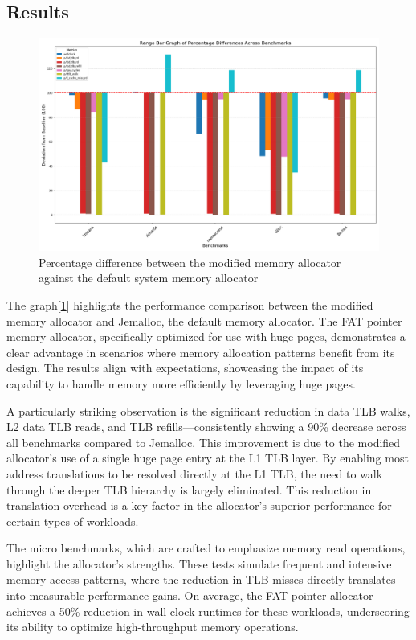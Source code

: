 \documentclass[11pt]{article}
\begin{document}
\subsection{Results}
\label{sec:org921a6b3}
\begin{figure}[htbp]
\centering
\includegraphics[width=.9\linewidth]{./diagrams/bargraph.png}
\caption{\label{fig:orga7f3598}Percentage difference between the modified memory allocator against the default system memory allocator}
\end{figure}


The graph[\ref{fig:orga7f3598}] highlights the performance comparison between the modified memory allocator and 
Jemalloc, the default memory allocator. The FAT pointer memory allocator, specifically optimized 
for use with huge pages, demonstrates a clear advantage in scenarios where memory allocation 
patterns benefit from its design. The results align with expectations, showcasing the impact 
of its capability to handle memory more efficiently by leveraging huge pages.

A particularly striking observation is the significant reduction in data TLB walks, 
L2 data TLB reads, and TLB refills—consistently showing a 90\% decrease across all 
benchmarks compared to Jemalloc. This improvement is due to the modified allocator's 
use of a single huge page entry at the L1 TLB layer. By enabling most address translations 
to be resolved directly at the L1 TLB, the need to walk through the deeper TLB hierarchy is 
largely eliminated. This reduction in translation overhead is a key factor in the allocator's 
superior performance for certain types of workloads.

The micro benchmarks, which are crafted to emphasize memory read operations, highlight the 
allocator's strengths. These tests simulate frequent and intensive memory access patterns, 
where the reduction in TLB misses directly translates into measurable performance gains. 
On average, the FAT pointer allocator achieves a 50\% reduction in wall clock runtimes for 
these workloads, underscoring its ability to optimize high-throughput memory operations.
\end{document}
